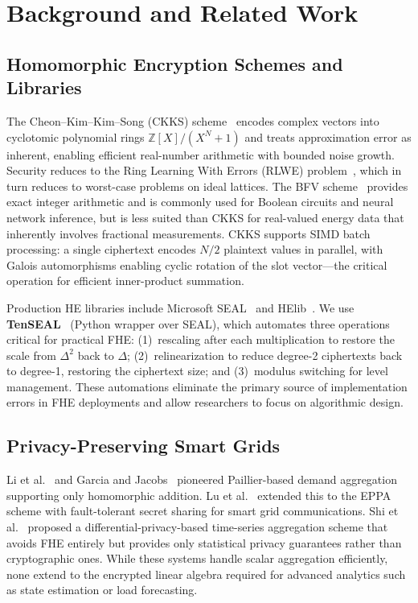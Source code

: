 \documentclass[conference]{IEEEtran}
\begin{document}
\section{Background and Related Work}
\label{sec:background}

\subsection{Homomorphic Encryption Schemes and Libraries}

The Cheon--Kim--Kim--Song (CKKS) scheme~\cite{Cheon2017} encodes complex vectors into cyclotomic polynomial rings $\mathbb{Z}[X]/(X^N{+}1)$ and treats approximation error as inherent, enabling efficient real-number arithmetic with bounded noise growth. Security reduces to the Ring Learning With Errors (RLWE) problem~\cite{Brakerski2011}, which in turn reduces to worst-case problems on ideal lattices. The BFV scheme~\cite{Fan2012} provides exact integer arithmetic and is commonly used for Boolean circuits and neural network inference, but is less suited than CKKS for real-valued energy data that inherently involves fractional measurements. CKKS supports SIMD batch processing: a single ciphertext encodes $N/2$ plaintext values in parallel, with Galois automorphisms enabling cyclic rotation of the slot vector---the critical operation for efficient inner-product summation.

Production HE libraries include Microsoft SEAL~\cite{SEAL2022} and HElib~\cite{Halevi2014}. We use \textbf{TenSEAL}~\cite{Benaissa2021} (Python wrapper over SEAL), which automates three operations critical for practical FHE: (1)~rescaling after each multiplication to restore the scale from $\Delta^2$ back to $\Delta$; (2)~relinearization to reduce degree-2 ciphertexts back to degree-1, restoring the ciphertext size; and (3)~modulus switching for level management. These automations eliminate the primary source of implementation errors in FHE deployments and allow researchers to focus on algorithmic design.

\subsection{Privacy-Preserving Smart Grids}

Li et al.~\cite{Li2010} and Garcia and Jacobs~\cite{Garcia2011} pioneered Paillier-based demand aggregation supporting only homomorphic addition. Lu et al.~\cite{Lu2012} extended this to the EPPA scheme with fault-tolerant secret sharing for smart grid communications. Shi et al.~\cite{Shi2011} proposed a differential-privacy-based time-series aggregation scheme that avoids FHE entirely but provides only statistical privacy guarantees rather than cryptographic ones. While these systems handle scalar aggregation efficiently, none extend to the encrypted linear algebra required for advanced analytics such as state estimation or load forecasting.
\end{document}
